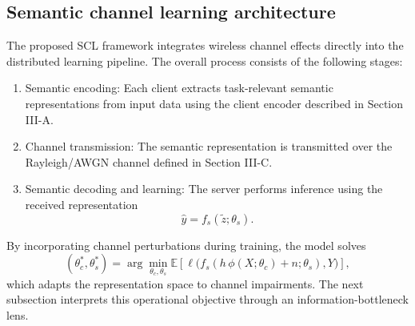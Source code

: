 \documentclass[10pt,journal]{IEEEtran}
\begin{document}
\subsection{Semantic channel learning architecture}
The proposed SCL framework integrates wireless channel effects directly into the distributed learning pipeline. The overall process consists of the following stages:
\begin{enumerate}
\item Semantic encoding:
Each client extracts task-relevant semantic representations from input data using the client encoder described in Section III-A.
\item Channel transmission:
The semantic representation is transmitted over the Rayleigh/AWGN channel defined in Section III-C.
\item Semantic decoding and learning:
The server performs inference using the received representation
\begin{equation}
\hat{y} = f_s(\tilde{z};\theta_s).
\end{equation}
\end{enumerate}
By incorporating channel perturbations during training, the model solves
\begin{equation}
(\theta_c^*,\theta_s^*)=\arg\min_{\theta_c,\theta_s}\mathbb{E}\left[\ell\big(f_s(h\,\phi(X;\theta_c)+n;\theta_s),Y\big)\right],
\end{equation}
which adapts the representation space to channel impairments.
The next subsection interprets this operational objective through an information-bottleneck lens.
\end{document}
